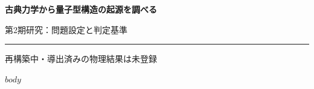 \documentclass[11pt,a4paper,openany]{report}
\numberwithin{equation}{chapter}
\theoremstyle{definition}
\theoremstyle{remark}
\begin{document}
\begin{titlepage}
  \centering
  \vspace*{42mm}
  {\sffamily\bfseries\color{PaperNavy}\fontsize{22}{31}\selectfont
    古典力学から量子型構造の起源を調べる\par}
  \vspace{11mm}
  {\Large\color{PaperBlue}第2期研究：問題設定と判定基準\par}
  \vspace{12mm}
  {\color{PaperRule}\rule{0.68\textwidth}{0.9pt}\par}
  \vfill
  {\large 再構築中・導出済みの物理結果は未登録\par}
  \vspace{20mm}
\end{titlepage}

\tableofcontents
\clearpage
{}

$body$
\end{document}
